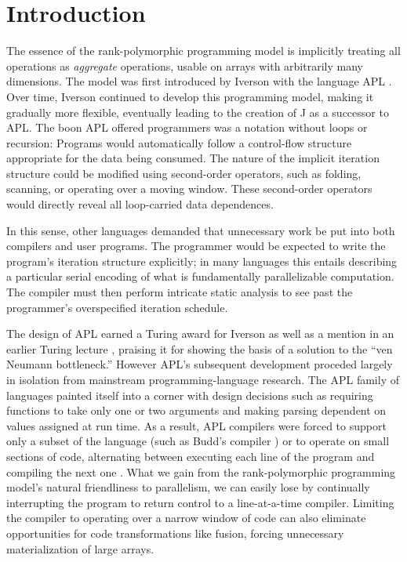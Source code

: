 \section{Introduction}

The essence of the rank-polymorphic programming model
is implicitly treating all operations as \emph{aggregate} operations,
usable on arrays with arbitrarily many dimensions.
The model was first introduced by Iverson with the language APL \cite{APL}.
Over time, Iverson continued to develop this programming model,
making it gradually more flexible,
eventually leading to the creation of J \cite{J} as a successor to APL.
The boon APL offered programmers
was a notation without loops or recursion:
Programs would automatically follow a control-flow structure
appropriate for the data being consumed.
The nature of the implicit iteration structure
could be modified using second-order operators,
such as folding, scanning, or operating over a moving window.
These second-order operators would directly reveal
all loop-carried data dependences.

In this sense,
other languages demanded that
unnecessary work be put into both compilers and user programs.
The programmer would be expected to
write the program's iteration structure explicitly;
in many languages this entails describing a particular serial encoding
of what is fundamentally parallelizable computation.
The compiler must then perform intricate static analysis
to see past the programmer's overspecified iteration schedule.

The design of APL earned a Turing award for Iverson \cite{IversonTuringLecture}
as well as a mention in an earlier Turing lecture \cite{BackusTuringLecture},
praising it for showing the basis of a solution to the ``ven Neumann bottleneck.''
However APL's subsequent development proceded largely in isolation
from mainstream programming-language research.
The APL family of languages %
painted itself into a corner with design decisions
such as requiring functions to take only one or two arguments
and making parsing dependent on values assigned at run time.
As a result,
APL compilers were forced to support only a subset of the language
(such as Budd's compiler \cite{BuddCompiler})
or to operate on small sections of code,
alternating between executing each line of the program and compiling the next one
\cite{APL3000Compiler}.
What we gain from
the rank-polymorphic programming model's
natural friendliness to parallelism,
we can easily lose by continually interrupting the program
to return control to a line-at-a-time compiler.
Limiting the compiler to operating over a narrow window of code
can also eliminate opportunities for code transformations like fusion,
forcing unnecessary materialization of large arrays.

